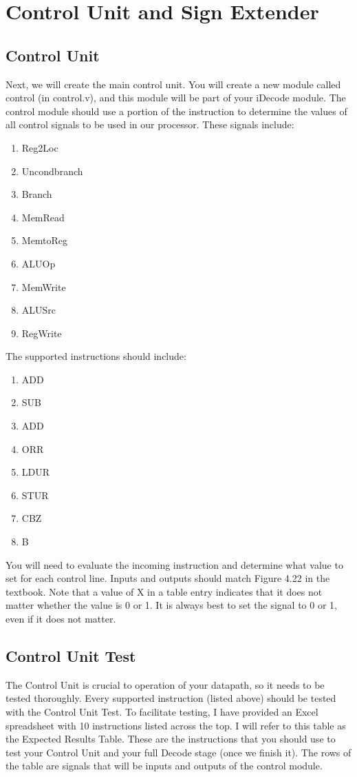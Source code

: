 \chapter{Control Unit and Sign Extender}

\section{Control Unit}
Next, we will create the main control unit.  You will create a new module called control (in control.v), and this module will be part of your iDecode module.  The control module should use a portion of the instruction to determine the values of all control signals to be used in our processor.  These signals include:
\begin{enumerate}
\item Reg2Loc
\item Uncondbranch
\item Branch
\item MemRead
\item MemtoReg
\item ALUOp
\item MemWrite
\item ALUSrc
\item RegWrite
\end{enumerate}

The supported instructions should include:
\begin{enumerate}
	\item ADD
	\item SUB
	\item ADD
	\item ORR
	\item LDUR
	\item STUR
	\item CBZ
	\item B
\end{enumerate}

You will need to evaluate the incoming instruction and determine what value to set for each control line.  Inputs and outputs should match Figure 4.22 in the textbook.  Note that a value of X in a table entry indicates that it does not matter whether the value is 0 or 1.  It is always best to set the signal to 0 or 1, even if it does not matter.

\section{Control Unit Test}
The Control Unit is crucial to operation of your datapath, so it needs to be tested thoroughly.  Every supported instruction (listed above) should be tested with the Control Unit Test.  To facilitate testing, I have provided an Excel spreadsheet with 10 instructions listed across the top.  I will refer to this table as the Expected Results Table.  These are the instructions that you should use to test your Control Unit and your full Decode stage (once we finish it).  The rows of the table are signals that will be inputs and outputs of the control module.  


